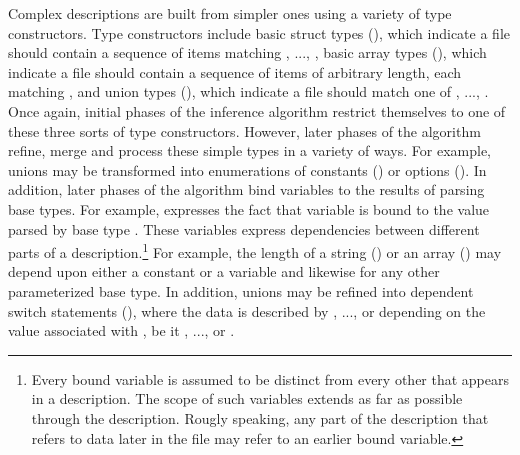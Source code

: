 Complex descriptions are built from simpler ones using a variety of
type constructors.  Type constructors include
basic struct types (), which indicate a file 
should contain a sequence of items matching , ..., ,
basic array types (), which indicate a file should contain
a sequence of items of arbitrary length, each matching ,
and union types (), which indicate a file
should match one of , ..., .  Once again, initial phases
of the inference algorithm restrict themselves to one of these three
sorts of type constructors.  However, later phases of the algorithm
refine, merge and process these simple types in a variety of ways.
For example, unions may be transformed into 
enumerations of constants
() or options ().  In
addition, later phases of the algorithm 
bind variables to the results of parsing 
base types.  For example,  expresses the fact that
variable  is bound to the value parsed by base type
.  These variables express dependencies between 
different parts
of a description.\footnote{Every bound variable is assumed to be distinct
from every other that appears in a description.  The scope of such variables
extends as far as possible through the description.  Rougly speaking,
any part of the 
description that refers to data later in the file may refer to an earlier
bound variable.}  For example, the length of a string ()
or an array () may depend upon either a constant or
a variable and likewise for any other parameterized base type.  In
addition, unions may be refined into dependent switch statements
(), where the
data is described by , ..., or  depending on the value
associated with , be it , ..., or .


